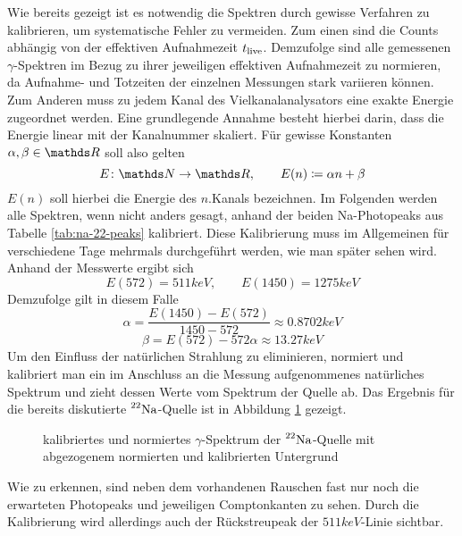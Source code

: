 		Wie bereits gezeigt ist es notwendig die Spektren durch gewisse Verfahren zu kalibrieren, um systematische Fehler zu vermeiden.
		Zum einen sind die Counts abhängig von der effektiven Aufnahmezeit $t_{\mathrm{live}}$.
		Demzufolge sind alle gemessenen $\gamma$-Spektren im Bezug zu ihrer jeweiligen effektiven Aufnahmezeit zu normieren, da Aufnahme- und Totzeiten der einzelnen Messungen stark variieren können. %
		Zum Anderen muss zu jedem Kanal des Vielkanalanalysators eine exakte Energie zugeordnet werden.
		Eine grundlegende Annahme besteht hierbei darin, dass die Energie linear mit der Kanalnummer skaliert.
		Für gewisse Konstanten $\alpha,\beta\in\SR$ soll also gelten
		\[
			\func{E}{\SN}{\SR},\qquad E(n)\define \alpha n + \beta
		\]
		$E(n)$ soll hierbei die Energie des $n$.Kanals bezeichnen.
		Im Folgenden werden alle Spektren, wenn nicht anders gesagt, anhand der beiden Na-Photopeaks aus Tabelle \ref{tab:na-22-peaks} kalibriert.
		Diese Kalibrierung muss im Allgemeinen für verschiedene Tage mehrmals durchgeführt werden, wie man später sehen wird.
		Anhand der Messwerte ergibt sich
		\[
			E(572) = 511\unit{keV},\qquad E(1450) = 1275\unit{keV}
		\]
		Demzufolge gilt in diesem Falle
		\[
			\alpha = \frac{E(1450)-E(572)}{1450-572} \approx 0.8702\unit{keV}
		\]
		\[
			\beta = E(572) - 572\alpha \approx 13.27 \unit{keV}
		\]
		Um den Einfluss der natürlichen Strahlung zu eliminieren, normiert und kalibriert man ein im Anschluss an die Messung aufgenommenes natürliches Spektrum und zieht dessen Werte vom Spektrum der Quelle ab.
		Das Ergebnis für die bereits diskutierte $\prescript{22}{}{\mathrm{Na}}$-Quelle ist in Abbildung \ref{fig:na-22-spec-back} gezeigt.

		\begin{figure}[htb]
			\centering
			
			\caption{kalibriertes und normiertes $\gamma$-Spektrum der $\prescript{22}{}{\mathrm{Na}}$-Quelle mit abgezogenem normierten und kalibrierten Untergrund}
			\label{fig:na-22-spec-back}
		\end{figure}

		Wie zu erkennen, sind neben dem vorhandenen Rauschen fast nur noch die erwarteten Photopeaks und jeweiligen Comptonkanten zu sehen.
		Durch die Kalibrierung wird allerdings auch der Rückstreupeak der $511\unit{keV}$-Linie sichtbar.

	

